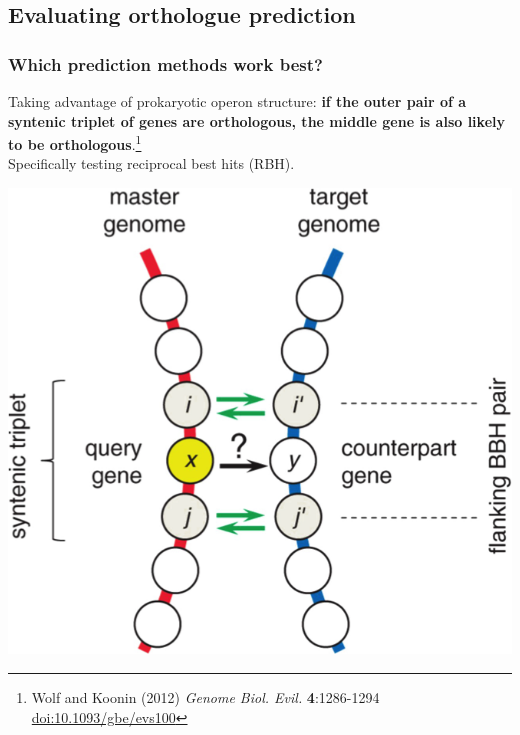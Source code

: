 
\subsection{Evaluating orthologue prediction}

\begin{frame}
  \frametitle{Which prediction methods work best?}
  Taking advantage of prokaryotic operon structure: \textbf{if the outer pair of a syntenic triplet of genes are orthologous, the middle gene is also likely to be orthologous}.\footnote{\tiny{Wolf and Koonin (2012) \textit{Genome Biol. Evil.} \textbf{4}:1286-1294 \href{http://dx.doi.org/10.1093/gbe/evs100}{doi:10.1093/gbe/evs100}}}\\
  Specifically testing reciprocal best hits (RBH).
  \begin{center}
      \includegraphics[height=0.45\textheight]{images/syntenic_triplet} 
  \end{center}
\end{frame}

